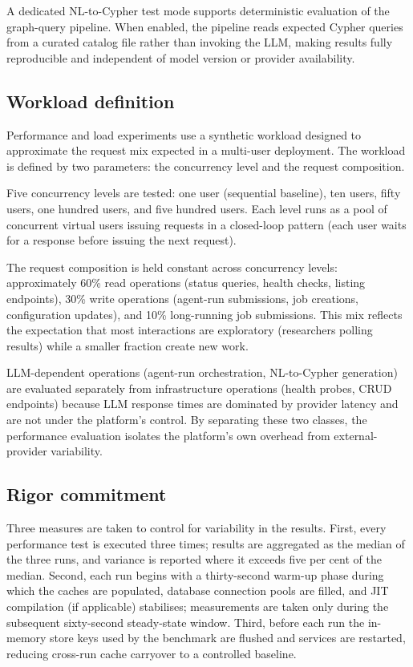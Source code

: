 \documentclass[a4paper,noexaminfo]{sapthesis}
\begin{document}
A dedicated NL-to-Cypher test mode supports deterministic evaluation of
the graph-query pipeline.  When enabled, the pipeline reads expected
Cypher queries from a curated catalog file rather than invoking the LLM,
making results fully reproducible and independent of model version or
provider availability.

\subsection{Workload definition}

Performance and load experiments use a synthetic workload designed to
approximate the request mix expected in a multi-user deployment.  The
workload is defined by two parameters: the concurrency level and the
request composition.

Five concurrency levels are tested: one user (sequential baseline), ten
users, fifty users, one hundred users, and five hundred users.  Each
level runs as a pool of concurrent virtual users issuing requests in a
closed-loop pattern (each user waits for a response before issuing the
next request).

The request composition is held constant across concurrency levels:
approximately 60\% read operations (status queries, health checks,
listing endpoints), 30\% write operations (agent-run submissions, job
creations, configuration updates), and 10\% long-running job submissions.
This mix reflects the expectation that most interactions are exploratory
(researchers polling results) while a smaller fraction create new work.

LLM-dependent operations (agent-run orchestration, NL-to-Cypher
generation) are evaluated separately from infrastructure operations
(health probes, CRUD endpoints) because LLM response times are dominated
by provider latency and are not under the platform's control.  By
separating these two classes, the performance evaluation isolates the
platform's own overhead from external-provider variability.

\subsection{Rigor commitment}

Three measures are taken to control for variability in the results.
First, every performance test is executed three times; results are
aggregated as the median of the three runs, and variance is reported
where it exceeds five per cent of the median.  Second, each run begins
with a thirty-second warm-up phase during which the caches are populated,
database connection pools are filled, and JIT compilation (if applicable)
stabilises; measurements are taken only during the subsequent sixty-second
steady-state window.  Third, before each run the in-memory store keys used by the
benchmark are flushed and services are restarted, reducing cross-run
cache carryover to a controlled baseline.
\end{document}
